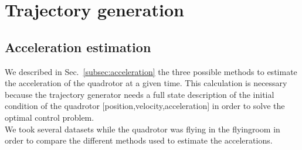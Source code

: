 \section{Trajectory generation}

\subsection{Acceleration estimation} \label{subsec:acceleration_experiments}
We described in Sec.~\ref{subsec:acceleration} the three possible methods to estimate the acceleration of the quadrotor at a given time. This calculation is necessary because the trajectory generator needs a full state description of the initial condition of the quadrotor [position,velocity,acceleration] in order to solve the optimal control problem.\\
We took several datasets while the quadrotor was flying in the flyingroom in order to compare the different methods used to estimate the accelerations.\\

